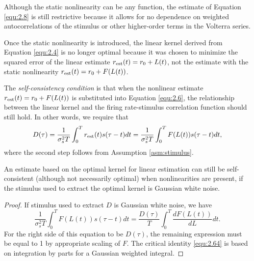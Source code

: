 \begin{rem}
  Although the static nonlinearity can be any function, the estimate of Equation \ref{equ:2.8} is still restrictive because it allows for no dependence on weighted autocorrelations of the stimulus or other higher-order terms in the Volterra series.
\end{rem}

\begin{rem}
  Once the static nonlinearity is introduced, the linear kernel derived from Equation \ref{equ:2.4} is no longer optimal because it was chosen to minimize the squared error of the linear estimate $r_{\rm{est}}(t) = r_0 + L(t)$, not the estimate with the static nonlinearity $r_{\rm{est}}(t) = r_0 + F(L(t))$.
\end{rem}

\begin{defn}
  \label{selfConsistency}
  The \emph{self-consistency condition} is that when the nonlinear estimate $r_{\rm{est}}(t) = r_0 + F(L(t))$ is substituted into Equation \ref{equ:2.6}, the relationship between the linear kernel and the firing rate-stimulus correlation function should still hold. In other words, we require that
  \begin{equation}
    \label{equ:2.63}
    D(\tau)  = \frac{1}{\sigma_s^2T}\int_0^Tr_{\rm{est}}(t)s(\tau-t)dt = \frac{1}{\sigma_s^2T}\int_0^TF(L(t))s(\tau-t)dt,
  \end{equation}
  where the second step follows from Assumption \ref{asm:stimulus}.
\end{defn}

\begin{thm}
  \label{thm:Bussgang}
  An estimate based on the optimal kernel for linear estimation can still be self-consistent (although not necessarily optimal) when nonlinearities are present, if the stimulus used to extract the optimal kernel is Gaussian white noise.
\end{thm}
\begin{proof}
  If stimulus used to extract $D$ is Gaussian white noise, we have
  \begin{equation}
    \label{equ:2.64}
    \frac{1}{\sigma_s^2T}\int_0^TF(L(t))s(\tau-t)dt = \frac{D(\tau)}{T}\int_0^T\frac{dF(L(t))}{dL}dt.
  \end{equation}
  For the right side of this equation to be $D(\tau)$, the remaining expression must be equal to 1 by appropriate scaling of $F$. The critical identity \ref{equ:2.64} is based on integration by parts for a Gaussian weighted integral.
\end{proof}

